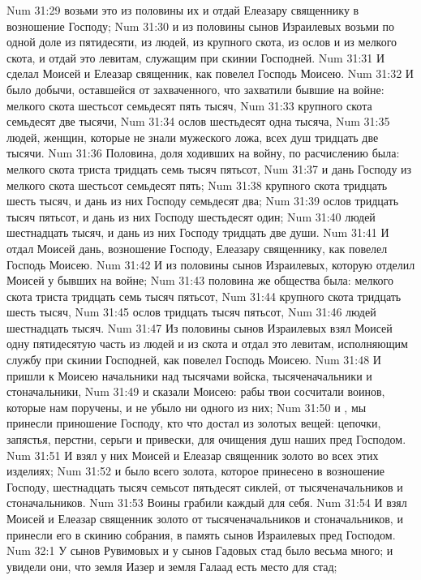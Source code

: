 \vs Num 31:29 возьми это из половины их и отдай Елеазару священнику в возношение Господу;
\vs Num 31:30 и из половины сынов Израилевых возьми по одной доле из пятидесяти, из людей, из крупного скота, из ослов и из мелкого скота, и отдай это левитам, служащим при скинии Господней.
\vs Num 31:31 И сделал Моисей и Елеазар священник, как повелел Господь Моисею.
\vs Num 31:32 И было добычи, оставшейся от захваченного, что захватили бывшие на войне: мелкого скота шестьсот семьдесят пять тысяч,
\vs Num 31:33 крупного скота семьдесят две тысячи,
\vs Num 31:34 ослов шестьдесят одна тысяча,
\vs Num 31:35 людей, женщин, которые не знали мужеского ложа, всех душ тридцать две тысячи.
\vs Num 31:36 Половина, доля ходивших на войну, по расчислению была: мелкого скота триста тридцать семь тысяч пятьсот,
\vs Num 31:37 и дань Господу из мелкого скота шестьсот семьдесят пять;
\vs Num 31:38 крупного скота тридцать шесть тысяч, и дань из них Господу семьдесят два;
\vs Num 31:39 ослов тридцать тысяч пятьсот, и дань из них Господу шестьдесят один;
\vs Num 31:40 людей шестнадцать тысяч, и дань из них Господу тридцать две души.
\vs Num 31:41 И отдал Моисей дань, возношение Господу, Елеазару священнику, как повелел Господь Моисею.
\vs Num 31:42 И из половины сынов Израилевых, которую отделил Моисей у бывших на войне;
\vs Num 31:43 половина же  общества была: мелкого скота триста тридцать семь тысяч пятьсот,
\vs Num 31:44 крупного скота тридцать шесть тысяч,
\vs Num 31:45 ослов тридцать тысяч пятьсот,
\vs Num 31:46 людей шестнадцать тысяч.
\vs Num 31:47 Из половины сынов Израилевых взял Моисей одну пятидесятую часть из людей и из скота и отдал это левитам, исполняющим службу при скинии Господней, как повелел Господь Моисею.
\vs Num 31:48 И пришли к Моисею начальники над тысячами войска, тысяченачальники и стоначальники,
\vs Num 31:49 и сказали Моисею: рабы твои сосчитали воинов, которые нам поручены, и не убыло ни одного из них;
\vs Num 31:50 и , мы принесли приношение Господу, кто что достал из золотых вещей: цепочки, запястья, перстни, серьги и привески, для очищения душ наших пред Господом.
\vs Num 31:51 И взял у них Моисей и Елеазар священник золото во всех этих изделиях;
\vs Num 31:52 и было всего золота, которое принесено в возношение Господу, шестнадцать тысяч семьсот пятьдесят сиклей, от тысяченачальников и стоначальников.
\vs Num 31:53 Воины грабили каждый для себя.
\vs Num 31:54 И взял Моисей и Елеазар священник золото от тысяченачальников и стоначальников, и принесли его в скинию собрания, в память сынов Израилевых пред Господом.
\vs Num 32:1 У сынов Рувимовых и у сынов Гадовых стад было весьма много; и увидели они, что земля Иазер и земля Галаад есть место  для стад;
